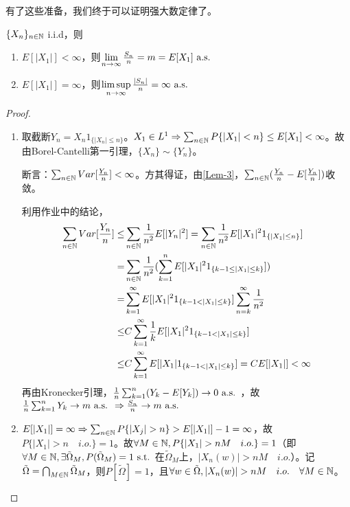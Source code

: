 \documentclass{ctexart}
\begin{document}
有了这些准备，我们终于可以证明强大数定律了。

\begin{Thm}
  $\{X_{n}\}_{n\in\mathbb{N}}$ i.i.d，则
  \begin{enumerate}
  \item $E[|X_{1}|]<\infty$，则$\lim\limits_{n\to\infty}\frac{S_{n}}{n}=m=E[X_{1}] \text{ a.s. }$
  \item $E[|X_{1}|]=\infty$，则$\limsup\limits_{n\to\infty}\frac{|S_{n}|}{n}=\infty \text{ a.s. }$
  \end{enumerate}
\end{Thm}
\begin{proof}
  \begin{enumerate}
  \item 取截断$Y_{n}=X_{n}1_{\{|X_{n}|\leq n\}}$。$X_{1}\in L^{1}\Rightarrow \sum_{n\in\mathbb{N}}P\{|X_{1}|<n\}\leq E[X_{1}]<\infty$。故由Borel-Cantelli第一引理，$\{X_{n}\}\sim \{Y_{n}\}$。


    断言：$\sum_{n\in\mathbb{N}} Var[\frac{Y_{n}}{n}]<\infty$。方其得证，由\ref{Lem-3}，$\sum_{n\in\mathbb{N}}(\frac{Y_{n}}{n}-E[\frac{Y_{n}}{n}])$收敛。
    
    利用作业中的结论，
    \begin{align*}
      \sum_{n\in\N}Var[\frac{Y_{n}}{n}]\leq&\sum_{n\in\N}\frac{1}{n^{2}}E[|Y_{n}|^{2}]=\sum_{n\in\N}\frac{1}{n^{2}}E[|X_{1}|^{2}1_{\{|X_{1}|\leq n\}}]\\
      =&\sum_{n\in \N}\frac{1}{n^{2}}(\sum_{k=1}^{n}E[|X_{1}|^{2}1_{\{k-1\leq |X_{1}|\leq k\}}])\\
      =&\sum_{k=1}^{\infty}E[|X_{1}|^{2}1_{\{k-1<|X_{1}|\leq k\}}]\sum_{n=k}^{\infty}\frac{1}{n^{2}}\\
      \leq& C\sum_{k=1}^{\infty}\frac{1}{k}E[|X_{1}|^{2}1_{\{k-1<|X_{1}|\leq k\}}]\\
      \leq& C\sum_{k=1}^{\infty}E[|X_{1}|1_{\{k-1<|X_{1}|\leq k\}}]=CE[|X_{1}|]<\infty
\end{align*}
    再由Kronecker引理，$\frac{1}{n}\sum_{k=1}^{n}(Y_{k}-E[Y_{k}])\to 0\text{ a.s. }$，故$\frac{1}{n}\sum_{k=1}^{n}Y_{k}\to m\text{ a.s. }\Rightarrow \frac{S_{n}}{n}\to m\text{ a.s. }$

  \item $E[|X_{1}|]=\infty\Rightarrow\sum_{n\in\N}P\{|X_{j}|>n\}>E[|X_{1}|]-1=\infty$，故$P\{|X_{1}|>n\quad i.o.\}=1$。故$\forall M\in\N, P\{|X_{1}|>nM\quad i.o.\}=1$（即$\forall M\in\mathbb{N},\exists \tilde\Omega_{M},P(\tilde\Omega_{M})=1\text{ s.t. }$在$\tilde{\Omega}_{M}$上，$|X_{n}(w)|>nM\quad i.o.$）。记$\tilde\Omega=\bigcap_{M\in\mathbb{N}}\tilde{\Omega}_{M}$，则$P[\tilde{\Omega}]=1$，且$\forall w\in\tilde{\Omega}, |X_{n}(w)|>nM\quad i.o.\quad \forall M\in\N$。


\end{enumerate}
\end{proof}
\end{document}
